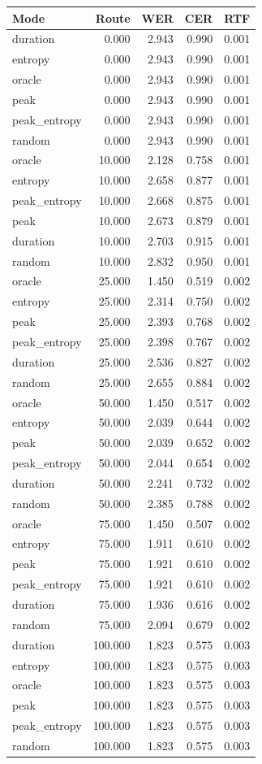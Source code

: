 \begin{tabular}{lrrrr}
\toprule
Mode & Route & WER & CER & RTF \\
\midrule
duration & 0.000 & 2.943 & 0.990 & 0.001 \\
entropy & 0.000 & 2.943 & 0.990 & 0.001 \\
oracle & 0.000 & 2.943 & 0.990 & 0.001 \\
peak & 0.000 & 2.943 & 0.990 & 0.001 \\
peak_entropy & 0.000 & 2.943 & 0.990 & 0.001 \\
random & 0.000 & 2.943 & 0.990 & 0.001 \\
oracle & 10.000 & 2.128 & 0.758 & 0.001 \\
entropy & 10.000 & 2.658 & 0.877 & 0.001 \\
peak_entropy & 10.000 & 2.668 & 0.875 & 0.001 \\
peak & 10.000 & 2.673 & 0.879 & 0.001 \\
duration & 10.000 & 2.703 & 0.915 & 0.001 \\
random & 10.000 & 2.832 & 0.950 & 0.001 \\
oracle & 25.000 & 1.450 & 0.519 & 0.002 \\
entropy & 25.000 & 2.314 & 0.750 & 0.002 \\
peak & 25.000 & 2.393 & 0.768 & 0.002 \\
peak_entropy & 25.000 & 2.398 & 0.767 & 0.002 \\
duration & 25.000 & 2.536 & 0.827 & 0.002 \\
random & 25.000 & 2.655 & 0.884 & 0.002 \\
oracle & 50.000 & 1.450 & 0.517 & 0.002 \\
entropy & 50.000 & 2.039 & 0.644 & 0.002 \\
peak & 50.000 & 2.039 & 0.652 & 0.002 \\
peak_entropy & 50.000 & 2.044 & 0.654 & 0.002 \\
duration & 50.000 & 2.241 & 0.732 & 0.002 \\
random & 50.000 & 2.385 & 0.788 & 0.002 \\
oracle & 75.000 & 1.450 & 0.507 & 0.002 \\
entropy & 75.000 & 1.911 & 0.610 & 0.002 \\
peak & 75.000 & 1.921 & 0.610 & 0.002 \\
peak_entropy & 75.000 & 1.921 & 0.610 & 0.002 \\
duration & 75.000 & 1.936 & 0.616 & 0.002 \\
random & 75.000 & 2.094 & 0.679 & 0.002 \\
duration & 100.000 & 1.823 & 0.575 & 0.003 \\
entropy & 100.000 & 1.823 & 0.575 & 0.003 \\
oracle & 100.000 & 1.823 & 0.575 & 0.003 \\
peak & 100.000 & 1.823 & 0.575 & 0.003 \\
peak_entropy & 100.000 & 1.823 & 0.575 & 0.003 \\
random & 100.000 & 1.823 & 0.575 & 0.003 \\
\bottomrule
\end{tabular}
